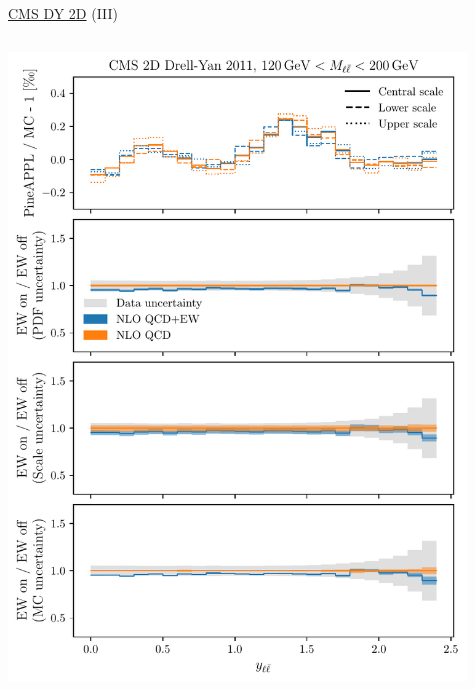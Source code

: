 \begin{frame}{\href{https://arxiv.org/abs/1412.1115}{CMS DY 2D} (III)}
\begin{columns}
\begin{column}{0.5\textwidth}
\includegraphics[width=0.95\textwidth]{ew_corrections/figures/pineappl_CMSDY2D11_bin5}
\end{column}
\begin{column}{0.5\textwidth}

\end{column}
\end{columns}
\end{frame}
